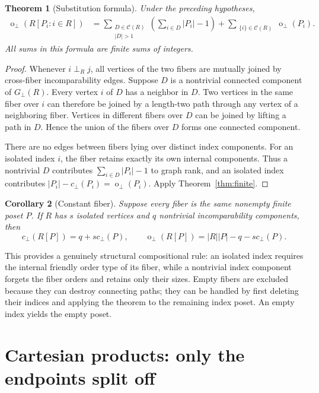 \documentclass[11pt,a4paper]{article}
\newtheorem{theorem}{Theorem}[section]
\newtheorem{corollary}[theorem]{Corollary}
\theoremstyle{definition}
\theoremstyle{remark}
\newcommand{\fot}{\operatorname{o}_{\perp}}
\newcommand{\incg}{G_{\perp}}
\newcommand{\cc}{c_{\perp}}
\begin{document}
\begin{theorem}[Substitution formula]\label{thm:substitution}
Under the preceding hypotheses,
\begin{align}
 \fot(R[P_i:i\in R])
 &=\sum_{\substack{D\in\mathcal C(R)\\|D|>1}}
       \left(\sum_{i\in D}|P_i|-1\right)
   +\sum_{\substack{\{i\}\in\mathcal C(R)}}\fot(P_i).
 \label{eq:substitution}
\end{align}
All sums in this formula are finite sums of integers.
\end{theorem}

\begin{proof}
Whenever $i\perp_R j$, all vertices of the two fibers are mutually joined
by cross-fiber incomparability edges. Suppose $D$ is a nontrivial connected
component of $\incg(R)$. Every vertex $i$ of $D$ has a neighbor in $D$.
Two vertices in the same fiber over $i$ can therefore be joined by a
length-two path through any vertex of a neighboring fiber. Vertices in
different fibers over $D$ can be joined by lifting a path in $D$. Hence the
union of the fibers over $D$ forms one connected component.

There are no edges between fibers lying over distinct index components.
For an isolated index $i$, the fiber retains exactly its own internal
components. Thus a nontrivial $D$ contributes
$\sum_{i\in D}|P_i|-1$ to graph rank, and an isolated index contributes
$|P_i|-\cc(P_i)=\fot(P_i)$. Apply Theorem~\ref{thm:finite}.
\end{proof}

\begin{corollary}[Constant fiber]\label{cor:constantfiber}
Suppose every fiber is the same nonempty finite poset $P$. If $R$ has $s$
isolated vertices and $q$ nontrivial incomparability components, then
\[
 \cc(R[P])=q+s\cc(P),\qquad
 \fot(R[P])=|R||P|-q-s\cc(P).
\]
\end{corollary}

This provides a genuinely structural compositional rule: an isolated index
requires the internal friendly order type of its fiber, while a nontrivial
index component forgets the fiber orders and retains only their sizes.
Empty fibers are excluded because they can destroy connecting paths; they
can be handled by first deleting their indices and applying the theorem
to the remaining index poset. An empty index yields the empty poset.

\section{Cartesian products: only the endpoints split off}
\end{document}
